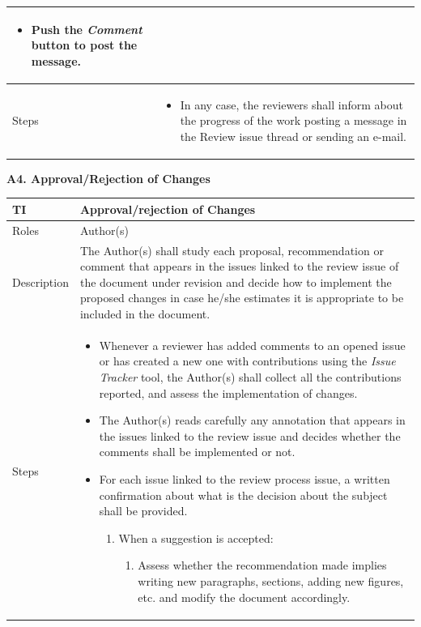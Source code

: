 \documentclass{template/openetcs_article}
\begin{document}
\begin{flushleft}
\begin{supertabular}{|m{2cm}|m{13cm}|}
\begin{enumerate}
\begin{itemize}
\item Push the {\it Comment} button to post the message.
\end{itemize}
\end{enumerate}
\\\hline
Steps &
\begin{itemize}
\item In any case, the reviewers shall inform about the progress of the work posting a message in the Review issue thread or sending an e-mail. 
\end{itemize}
\\\hline
\end{supertabular}
\end{flushleft}

\textbf{A4. Approval/Rejection of Changes}

\begin{flushleft}
\tablefirsthead{}
\tablehead{}
\tabletail{}
\tablelasttail{}
\begin{supertabular}{|m{2cm}|m{13cm}|}
\hline
{}
TI & 
Approval/rejection of Changes
\\\hline
Roles &
Author(s)
\\\hline
Description &
The Author(s) shall study each proposal, recommendation or comment that appears in the issues linked to the review issue of the document under revision and decide how to implement the proposed changes in case he/she estimates it is appropriate to be included in the document. 
\\\hline
Steps &
\begin{itemize}
\item Whenever a reviewer has added comments to an opened issue or has created a new one with contributions using the {\it Issue Tracker} tool, the Author(s) shall collect all the contributions reported, and assess the implementation of changes. 
\item The Author(s) reads carefully any annotation that appears in the issues linked to the review issue and decides whether the comments shall be implemented or not.
\item For each issue linked to the review process issue, a written confirmation about what is the decision about the subject shall be provided. 
\begin{enumerate}
\item When a suggestion is accepted:
\begin{enumerate}
\item Assess whether the recommendation made implies writing new paragraphs, sections, adding new figures, etc. and modify the document accordingly. 

\end{enumerate}
\end{enumerate}
\end{itemize}
\end{supertabular}
\end{flushleft}
\end{document}
